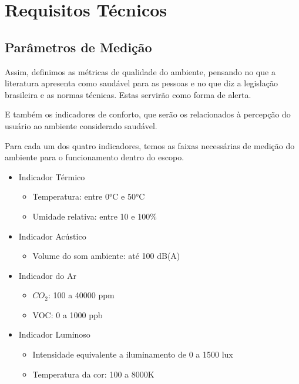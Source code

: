 \documentclass[../monografia.tex]{subfiles}
\begin{document}
\section{Requisitos Técnicos}

\subsection{Parâmetros de Medição}

Assim, definimos as métricas de qualidade do ambiente, pensando no que a literatura apresenta como saudável para as pessoas e no que diz a legislação brasileira e as normas técnicas. Estas servirão como forma de alerta. 

E também os indicadores de conforto, que serão os relacionados à percepção do usuário ao ambiente considerado saudável. 

Para cada um dos quatro indicadores, temos as faixas necessárias de medição do ambiente para o funcionamento dentro do escopo.

\begin{itemize}
	\item Indicador Térmico
	\begin{itemize}
		\item Temperatura: entre 0°C e 50°C
		\item Umidade relativa: entre 10 e 100\%
	\end{itemize} 
	\item Indicador Acústico
	\begin{itemize}
		\item Volume do som ambiente: até 100 dB(A)
	\end{itemize} 
	\item Indicador do Ar
	\begin{itemize}
		\item $CO_{2}$: 100 a 40000 ppm
		\item VOC: 0 a 1000 ppb
	\end{itemize} 
	\item Indicador Luminoso
	\begin{itemize}
		\item Intensidade equivalente a iluminamento de 0 a 1500 lux
		\item Temperatura da cor: 100 a 8000K
	\end{itemize} 

\end{itemize}

\end{document}
